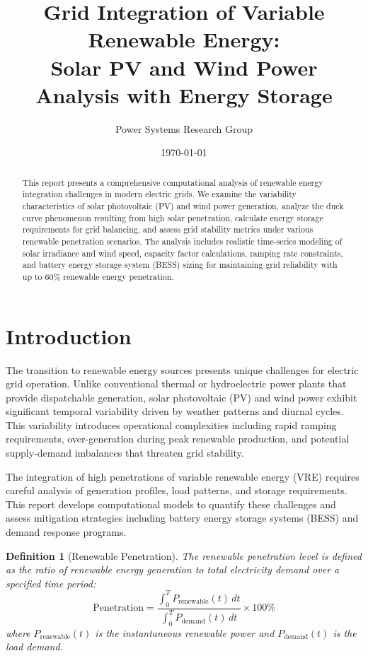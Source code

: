 \documentclass[11pt,a4paper]{article}
\title{Grid Integration of Variable Renewable Energy:\\
Solar PV and Wind Power Analysis with Energy Storage}
\author{Power Systems Research Group}
\date{\today}
\newtheorem{definition}{Definition}[section]
\begin{document}
\maketitle

\begin{abstract}
This report presents a comprehensive computational analysis of renewable energy integration challenges
in modern electric grids. We examine the variability characteristics of solar photovoltaic (PV) and
wind power generation, analyze the duck curve phenomenon resulting from high solar penetration,
calculate energy storage requirements for grid balancing, and assess grid stability metrics under
various renewable penetration scenarios. The analysis includes realistic time-series modeling of
solar irradiance and wind speed, capacity factor calculations, ramping rate constraints, and
battery energy storage system (BESS) sizing for maintaining grid reliability with up to 60\%
renewable energy penetration.
\end{abstract}

\section{Introduction}

The transition to renewable energy sources presents unique challenges for electric grid operation.
Unlike conventional thermal or hydroelectric power plants that provide dispatchable generation,
solar photovoltaic (PV) and wind power exhibit significant temporal variability driven by weather
patterns and diurnal cycles. This variability introduces operational complexities including rapid
ramping requirements, over-generation during peak renewable production, and potential supply-demand
imbalances that threaten grid stability.

The integration of high penetrations of variable renewable energy (VRE) requires careful analysis
of generation profiles, load patterns, and storage requirements. This report develops computational
models to quantify these challenges and assess mitigation strategies including battery energy
storage systems (BESS) and demand response programs.

\begin{definition}[Renewable Penetration]
The renewable penetration level is defined as the ratio of renewable energy generation to total
electricity demand over a specified time period:
\begin{equation}
\text{Penetration} = \frac{\int_0^T P_{\text{renewable}}(t) \, dt}{\int_0^T P_{\text{demand}}(t) \, dt} \times 100\%
\end{equation}
where $P_{\text{renewable}}(t)$ is the instantaneous renewable power and $P_{\text{demand}}(t)$ is
the load demand.
\end{definition}
\end{document}
